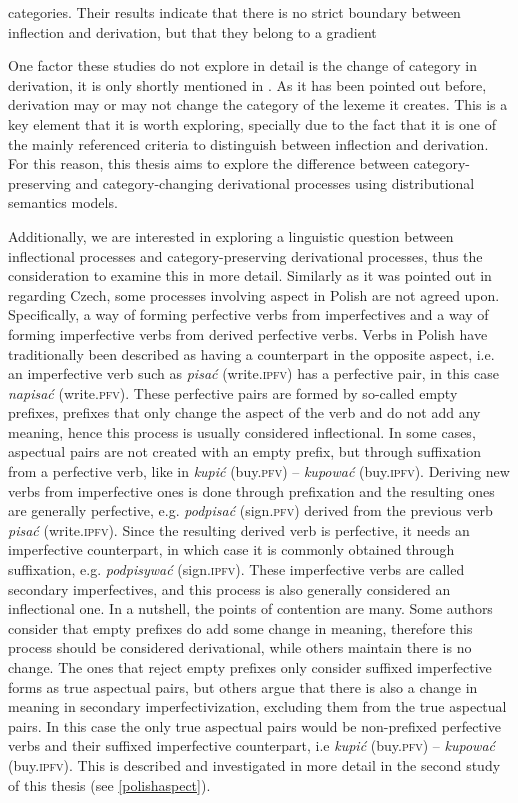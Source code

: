 \documentclass[12pt]{article}
\newcommand{\ita}[1]{\textit{#1}}
\begin{document}
categories. Their results indicate that there is no strict boundary between inflection and derivation, but that they belong to a gradient

One factor these studies do not explore in detail is the change of category in derivation, it is only shortly mentioned in \textcite{rosa2019AttemptingSeparateInflection}. As it has been pointed out before, derivation may or may not change the category of the lexeme it creates. This is a key element that it is worth exploring, specially due to the fact that it is one of the mainly referenced criteria to distinguish between inflection and derivation. For this reason, this thesis aims to explore the difference between category-preserving and category-changing derivational processes using distributional semantics models.

Additionally, we are interested in exploring a linguistic question between inflectional processes and category-preserving derivational processes, thus the consideration to examine this in more detail. Similarly as it was pointed out in \textcite{rosa2019AttemptingSeparateInflection} regarding Czech, some processes involving aspect in Polish are not agreed upon. Specifically, a way of forming perfective verbs from imperfectives and a way of forming imperfective verbs from derived perfective verbs. Verbs in Polish have traditionally been described as having a counterpart in the opposite aspect, i.e. an imperfective verb such as \ita{pisać} (write.\textsc{ipfv}) has a perfective pair, in this case \ita{napisać} (write.\textsc{pfv}). These perfective pairs are formed by so-called empty prefixes, prefixes that only change the aspect of the verb and do not add any meaning, hence this process is usually considered inflectional. In some cases, aspectual pairs are not created with an empty prefix, but through suffixation from a perfective verb, like in \ita{kupić} (buy.\textsc{pfv}) -- \ita{kupować} (buy.\textsc{ipfv}). Deriving new verbs from imperfective ones is done through prefixation and the resulting ones are generally perfective, e.g. \ita{podpisać} (sign.\textsc{pfv}) derived from the previous verb \ita{pisać} (write.\textsc{ipfv}). Since the resulting derived verb is perfective, it needs an imperfective counterpart, in which case it is commonly obtained through suffixation, e.g. \ita{podpisywać} (sign.\textsc{ipfv}). These imperfective verbs are called secondary imperfectives, and this process is also generally considered an inflectional one. In a nutshell, the points of contention are many. Some authors consider that empty prefixes do add some change in meaning, therefore this process should be considered derivational, while others maintain there is no change. The ones that reject empty prefixes only consider suffixed imperfective forms as true aspectual pairs, but others argue that there is also a change in meaning in secondary imperfectivization, excluding them from the true aspectual pairs. In this case the only true aspectual pairs would be non-prefixed perfective verbs and their suffixed imperfective counterpart, i.e \ita{kupić} (buy.\textsc{pfv}) -- \ita{kupować} (buy.\textsc{ipfv}). This is described and investigated in more detail in the second study of this thesis (see \autoref{polishaspect}). 
\end{document}

